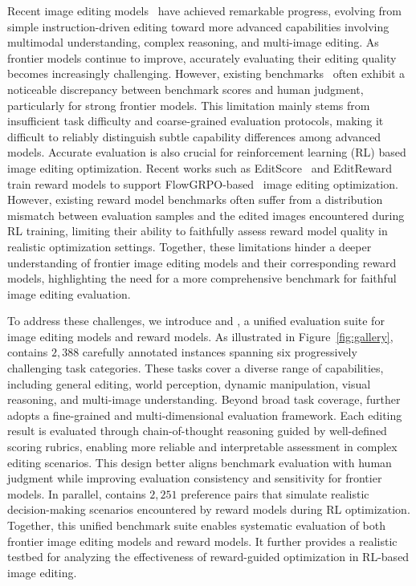 Recent image editing models~\cite{brooks2023instructpix2pix, chen2025opengpt,labs2025flux, wang2025scone,tong2026cof,zhu2026layermultilayerrepresentationfusion,zhao2024ultraedit,yu2025anyedit} have achieved remarkable progress, evolving from simple instruction-driven editing toward more advanced capabilities involving multimodal understanding, complex reasoning, and multi-image editing. 
As frontier models continue to improve, accurately evaluating their editing quality becomes increasingly challenging.
However, existing benchmarks~\cite{ye2025imgedit,liu2025step1x,pan2025ice} often exhibit a noticeable discrepancy between benchmark scores and human judgment, particularly for strong frontier models.
This limitation mainly stems from insufficient task difficulty and coarse-grained evaluation protocols, making it difficult to reliably distinguish subtle capability differences among advanced models.
Accurate evaluation is also crucial for reinforcement learning (RL) based image editing optimization.
Recent works such as EditScore~\cite{luo2025editscore} and EditReward~\cite{wu2025editreward} train reward models to support FlowGRPO-based~\cite{liu2025flow} image editing optimization.
However, existing reward model benchmarks often suffer from a distribution mismatch between evaluation samples and the edited images encountered during RL training, limiting their ability to faithfully assess reward model quality in realistic optimization settings.
Together, these limitations hinder a deeper understanding of frontier image editing models and their corresponding reward models, highlighting the need for a more comprehensive benchmark for faithful image editing evaluation.



To address these challenges, we introduce \textbf{{\bench}} and \textbf{{\rmbench}}, a unified evaluation suite for image editing models and reward models.
As illustrated in Figure~\ref{fig:gallery}, {\bench} contains $2,388$ carefully annotated instances spanning six progressively challenging task categories.
These tasks cover a diverse range of capabilities, including general editing, world perception, dynamic manipulation, visual reasoning, and multi-image understanding.
Beyond broad task coverage, {\bench} further adopts a fine-grained and multi-dimensional evaluation framework.
Each editing result is evaluated through chain-of-thought reasoning guided by well-defined scoring rubrics, enabling more reliable and interpretable assessment in complex editing scenarios.
This design better aligns benchmark evaluation with human judgment while improving evaluation consistency and sensitivity for frontier models.
In parallel, {\rmbench} contains $2,251$ preference pairs that simulate realistic decision-making scenarios encountered by reward models during RL optimization.
Together, this unified benchmark suite enables systematic evaluation of both frontier image editing models and reward models.
It further provides a realistic testbed for analyzing the effectiveness of reward-guided optimization in RL-based image editing.


